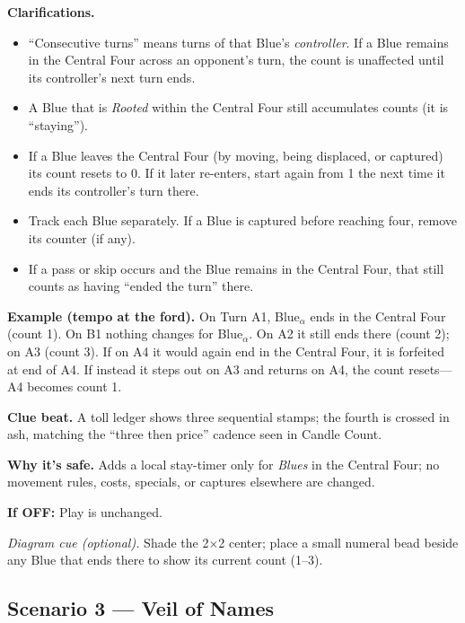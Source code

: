 \documentclass[11pt]{article}
\numberwithin{equation}{section} %
\theoremstyle{plain} %
\theoremstyle{definition} %
\theoremstyle{remark} %
\begin{document}
\medskip
\noindent\textbf{Clarifications.}
\begin{itemize}\setlength\itemsep{0.25em}
  \item “Consecutive turns” means turns of that Blue’s \emph{controller}. If a Blue remains in the Central Four across an opponent’s turn, the count is unaffected until its controller’s next turn ends.
  \item A Blue that is \emph{Rooted} within the Central Four still accumulates counts (it is “staying”).
  \item If a Blue leaves the Central Four (by moving, being displaced, or captured) its count resets to 0. If it later re-enters, start again from 1 the next time it ends its controller’s turn there.
  \item Track each Blue separately. If a Blue is captured before reaching four, remove its counter (if any).
  \item If a pass or skip occurs and the Blue remains in the Central Four, that still counts as having “ended the turn” there.
\end{itemize}

\medskip
\noindent\textbf{Example (tempo at the ford).}  
On Turn A1, Blue\(_\alpha\) ends in the Central Four (count 1). On B1 nothing changes for Blue\(_\alpha\). On A2 it still ends there (count 2); on A3 (count 3). If on A4 it would again end in the Central Four, it is forfeited at end of A4. If instead it steps out on A3 and returns on A4, the count resets—A4 becomes count 1.

\medskip
\noindent\textbf{Clue beat.} A toll ledger shows three sequential stamps; the fourth is crossed in ash, matching the “three then price” cadence seen in Candle Count.

\medskip
\noindent\textbf{Why it’s safe.} Adds a local stay-timer only for \emph{Blues} in the Central Four; no movement rules, costs, specials, or captures elsewhere are changed.

\medskip
\noindent\textbf{If \textsc{OFF}:} Play is unchanged.

\medskip
\noindent\textit{Diagram cue (optional).} Shade the 2\(\times\)2 center; place a small numeral bead beside any Blue that ends there to show its current count (1–3).

\subsection{Scenario 3 — Veil of Names}
\label{scen:veil-of-names}
\end{document}
